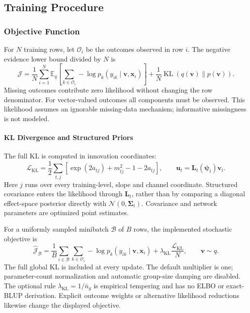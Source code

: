 \documentclass[12pt,a4paper]{article}
\newcommand{\E}{\mathbb{E}}
\newcommand{\N}{\mathcal{N}}
\begin{document}
\subsection{Training Procedure}
\label{sec:training}

\subsubsection{Objective Function}

For $N$ training rows, let $\mathcal O_i$ be the outcomes observed in row $i$. The negative evidence lower bound divided by $N$ is
\begin{equation}
 \mathcal J=\frac1N\sum_{i=1}^N\E_q\left[
   \sum_{k\in\mathcal O_i}-\log p_k(y_{ik}\mid\mathbf v,\mathbf x_i)\right]
   +\frac1N\operatorname{KL}(q(\mathbf v)\|p(\mathbf v)).
\end{equation}
Missing outcomes contribute zero likelihood without changing the row denominator. For vector-valued outcomes all components must be observed. This likelihood assumes an ignorable missing-data mechanism; informative missingness is not modeled.

\paragraph{KL Divergence and Structured Priors}
The full KL is computed in innovation coordinates:
\begin{equation}
 \mathcal L_{\mathrm{KL}}=\frac12\sum_{t,j}
 \left[\exp(2a_{tj})+m_{tj}^2-1-2a_{tj}\right],
 \qquad \mathbf u_t=\mathbf L_t(\boldsymbol\psi_t)\mathbf v_t.
\end{equation}
Here $j$ runs over every training-level, slope and channel coordinate. Structured covariance enters the likelihood through $\mathbf L_t$, rather than by comparing a diagonal effect-space posterior directly with $\N(0,\mathbf\Sigma_t)$. Covariance and network parameters are optimized point estimates.

For a uniformly sampled minibatch $\mathcal B$ of $B$ rows, the implemented stochastic objective is
\begin{equation}
 \widehat{\mathcal J}_{\mathcal B}
 =\frac1B\sum_{i\in\mathcal B}\sum_{k\in\mathcal O_i}
     -\log p_k(y_{ik}\mid\mathbf v,\mathbf x_i)
     +\lambda_{\mathrm{KL}}\frac{\mathcal L_{\mathrm{KL}}}{N},
 \qquad \mathbf v\sim q.
\end{equation}
The full global KL is included at every update. The default multiplier is one; parameter-count normalization and automatic group-size damping are disabled. The optional rule $\lambda_{\mathrm{KL}}=1/\bar n_g$ is empirical tempering and has no ELBO or exact-BLUP derivation. Explicit outcome weights or alternative likelihood reductions likewise change the displayed objective.
\end{document}
